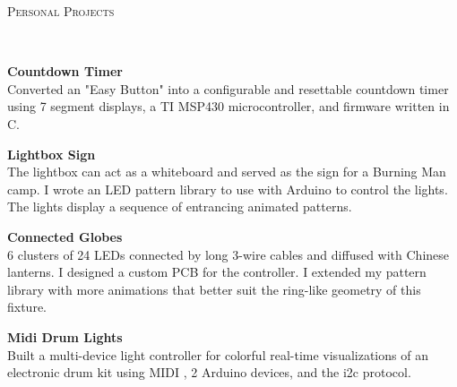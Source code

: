 \documentclass{article}
\newenvironment{changemargin}[2]{%
  \begin{list}{}{%
    \setlength{\topsep}{0pt}%
    \setlength{\leftmargin}{#1}%
    \setlength{\rightmargin}{#2}%
    \setlength{\listparindent}{\parindent}%
    \setlength{\itemindent}{\parindent}%
    \setlength{\parsep}{\parskip}%
  }%
  \item[]}{\end{list}
}
\newcommand{\lineover}{
	\begin{changemargin}{-0.05in}{-0.05in}
		\vspace*{-8pt}
		\hrulefill \\
		\vspace*{-2pt}
	\end{changemargin}
}
\newcommand{\header}[1]{
	\begin{changemargin}{-0.5in}{-0.5in}
		\scshape{#1}\\
  	\lineover
	\end{changemargin}
}
\newenvironment{body} {
	\vspace*{-16pt}
	\begin{changemargin}{-0.25in}{-0.5in}
  }	
	{\end{changemargin}
}
\begin{document}
\header{Personal Projects}
\begin{body}
	\vspace{20pt}

	\textbf{Countdown Timer}\\
	Converted an "Easy Button" into a configurable and resettable countdown timer 
	using 7 segment displays, a TI MSP430 microcontroller, and firmware written in C.
	
	\vspace{8pt}
	\textbf{Lightbox Sign}\\
	The lightbox can act as a whiteboard and served as the sign for a Burning Man camp. I wrote an LED pattern library to use with Arduino to control the lights. The lights display a sequence of entrancing animated patterns.
	
	\vspace{8pt}
	\textbf{Connected Globes}\\
	6 clusters of 24 LEDs connected by long 3-wire cables and diffused with Chinese lanterns. I designed a custom PCB for the controller. I extended my pattern library with more animations that better suit the ring-like geometry of this fixture.
	
	\vspace{8pt}
	\textbf{Midi Drum Lights}\\
	Built a multi-device light controller for colorful real-time visualizations of an electronic drum kit using MIDI , 2 Arduino devices, and the i2c protocol.
		
\end{body}
\end{document}
